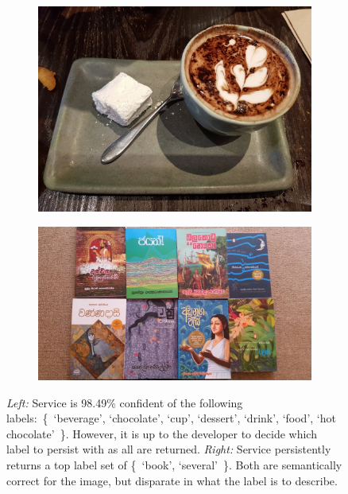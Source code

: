 \begin{figure}[t]
  \centering
  \begin{subfigure}[b]{0.49\linewidth}
    \centering
    \includegraphics[width=.8\linewidth]{1276}  
    \caption{}
    \label{icsme2019:fig:sample-images:coffee}
  \end{subfigure}
  \hfill
  \begin{subfigure}[b]{0.49\linewidth}
    \centering
    \includegraphics[width=.8\linewidth]{0107} 
    \caption{}
    \label{icsme2019:fig:sample-images:books}
  \end{subfigure}
  \caption[CV services can return multiple top labels]{
    \textit{Left:} Service \awsapi{} is 98.49\% confident of the following labels:~\{~`beverage', `chocolate', `cup', `dessert', `drink', `food', `hot chocolate'~\}. However, it is up to the developer to decide which label to persist with as all are returned.
    \textit{Right:} Service \azureapi{} persistently returns a top label set of \{~`book', `several'~\}. Both are semantically correct for the image, but disparate in what the label is to describe.
    }
\end{figure}


